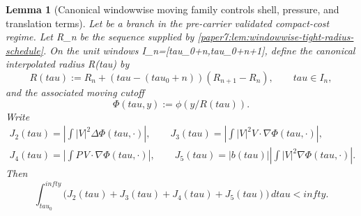 \documentclass[11pt]{amsart}
\def\({}%
\def\){}%
\def\tau{tau}%
\def\infty{infty}%
\theoremstyle{plain}
\newtheorem{lemma}[lemma]{Lemma}
\theoremstyle{definition}
\theoremstyle{remark}
\begin{document}
\begin{lemma}[Canonical windowwise moving family controls shell, pressure, and translation terms]
\label{paper7:lem:windowwise-shell-pressure-translation}
Let \(\omega\) be a branch in the pre-carrier validated compact-cost regime.
Let \(R_n\) be the sequence supplied by
\cref{paper7:lem:windowwise-tight-radius-schedule}.  On the unit windows
\(I_n=[\tau_0+n,\tau_0+n+1]\), define the canonical interpolated radius
\(R(\tau)\) by
\[
  R(\tau)
  :=
  R_n+(\tau-(\tau_0+n))(R_{n+1}-R_n),
  \qquad \tau\in I_n,
\]
and the associated moving cutoff
\[
  \Phi(\tau,y):=\phi(y/R(\tau)).
\]
Write
\[
\begin{gathered}
  J_2(\tau)=\left|\int |V|^2\Delta\Phi(\tau,\cdot)\right|,\qquad
  J_3(\tau)=\left|\int |V|^2V\cdot\nabla\Phi(\tau,\cdot)\right|,\\
  J_4(\tau)=\left|\int P\,V\cdot\nabla\Phi(\tau,\cdot)\right|,\qquad
  J_5(\tau)=|b(\tau)|\left|\int |V|^2\nabla\Phi(\tau,\cdot)\right|.
\end{gathered}
\]
Then
\[
  \int_{\tau_0}^{\infty}
  \bigl(J_2(\tau)+J_3(\tau)+J_4(\tau)+J_5(\tau)\bigr)\,d\tau
  <\infty.
\]
\end{lemma}
\end{document}
